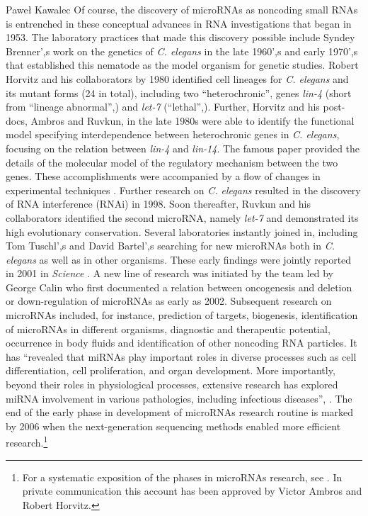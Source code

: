 \begin{artengenv}{Paweł Kawalec}
Of course, the discovery of microRNAs as noncoding small RNAs is entrenched in these conceptual advances in RNA investigations that began in 1953. The laboratory practices that made this discovery possible include Syndey Brenner',s work on the genetics of \textit{C. elegans} in the late 1960',s and early 1970',s that established this nematode as the model organism for genetic studies. Robert Horvitz and his collaborators by 1980 identified cell lineages for \textit{C. elegans} and its mutant forms (24 in total), including two ``heterochronic'', genes \textit{lin-4} (short from ``lineage abnormal'',) and \textit{let-7} (``lethal'',). Further, Horvitz and his post-docs, Ambros and Ruvkun, in the late 1980s were able to identify the functional model specifying interdependence between heterochronic genes in \textit{C. elegans}, focusing on the relation between \textit{lin-4} and \textit{lin-14}. The famous paper
\parencite[][]{lee_c_1993} %
 provided the details of the molecular model of the regulatory mechanism between the two genes. These accomplishments were accompanied by a flow of changes in experimental techniques 
\parencite[][]{giovagnoli_cognitive_2020}. %
 Further research on \textit{C. elegans} resulted in the discovery of RNA interference (RNAi) in 1998. Soon thereafter, Ruvkun and his collaborators identified the second microRNA, namely \textit{let-7} and demonstrated its high evolutionary conservation. Several laboratories instantly joined in, including Tom Tuschl',s and David Bartel',s searching for new microRNAs both in \textit{C. elegans} as well as in other organisms. These early findings were jointly reported in 2001 in \textit{Science} 
\parencites[][]{lagos-quintana_identification_2001}[][]{lau_abundant_2001}[][]{lee_extensive_2001}. %
 A new line of research was initiated by the team led by George Calin who first documented a relation between oncogenesis and deletion or down-regulation of microRNAs as early as 2002. Subsequent research on microRNAs included, for instance, prediction of targets, biogenesis, identification of microRNAs in different organisms, diagnostic and therapeutic potential, occurrence in body fluids and identification of other noncoding RNA particles. It has ``revealed that miRNAs play important roles in diverse processes such as cell differentiation, cell proliferation, and organ development. More importantly, beyond their roles in physiological processes, extensive research has explored miRNA involvement in various pathologies, including infectious diseases'', 
\parencite[][p.4246]{fu_circulating_2011}. %
 The end of the early phase in development of microRNAs research routine is marked by 2006 when the next-generation sequencing methods enabled more efficient research.\footnote{For a systematic exposition of the phases in microRNAs research, see 
\parencite[][]{kawalec_transformations_2018}. %
 In private communication this account has been approved by Victor Ambros and Robert Horvitz.}


\end{artengenv}
